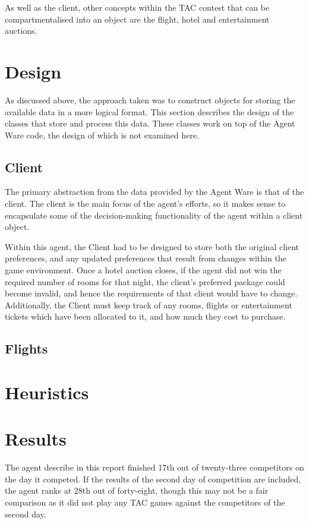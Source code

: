 \documentclass{acm_proc_article-sp}
\begin{document}
 As well as the client, other concepts within the TAC contest that can be compartmentalised into an object are the flight, hotel and entertainment auctions.

\section{Design}

 As discussed above, the approach taken was to construct objects for storing the available data in a more logical format.  This section describes the design of the classes that store and process this data.  These classes work on top of the Agent Ware code, the design of which is not examined here.
 
 \subsection{Client}
  The primary abstraction from the data provided by the Agent Ware is that of the client.  The client is the main focus of the agent's efforts, so it makes sense to encapsulate some of the decision-making functionality of the agent within a client object.
  
  Within this agent, the Client had to be designed to store both the original client preferences, and any updated preferences that result from changes within the game environment.  Once a hotel auction closes, if the agent did not win the required number of rooms for that night, the client's preferred package could become invalid, and hence the requirements of that client would have to change.  Additionally, the Client must keep track of any rooms, flights or entertainment tickets which have been allocated to it, and how much they cost to purchase.
  
  \subsection{Flights}

\section{Heuristics}

\section{Results}
 The agent describe in this report finished 17th out of twenty-three competitors on the day it competed.  If the results of the second day of competition are included, the agent ranks at 28th out of forty-eight, though this may not be a fair comparison as it did not play any TAC games against the competitors of the second day.
\end{document}
